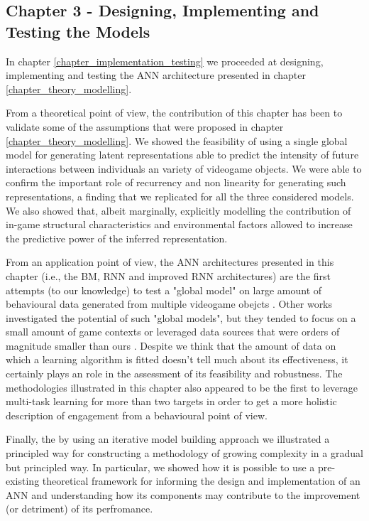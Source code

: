 \subsection{Chapter 3 - Designing, Implementing and Testing the Models }
\label{discussion_chapter_three}
In chapter \ref{chapter_implementation_testing} we proceeded at designing, implementing and testing the ANN architecture presented in chapter \ref{chapter_theory_modelling}.

From a theoretical point of view, the contribution of this chapter has been to validate some of the assumptions that were proposed in chapter \ref{chapter_theory_modelling}. We showed the feasibility of using a single global model for generating latent representations able to predict the intensity of future interactions between individuals an variety of videogame objects. We were able to confirm the important role of recurrency and non linearity for generating such representations, a finding that we replicated for all the three considered models. We also showed that, albeit marginally, explicitly modelling the contribution of in-game structural characteristics and environmental factors allowed to increase the predictive power of the inferred representation. 

From an application point of view, the ANN architectures presented in this chapter (i.e., the BM, RNN and improved RNN architectures) are the first attempts (to our knowledge) to test a "global model" on large amount of behavioural data generated from multiple videogame obejcts \cite{perianez2016churn, liu2018semi,kristensen2019combining,liu2019micro, roohi2020predicting}. Other works investigated the potential of such "global models", but they tended to focus on a small amount of game contexts \cite{zhao2020multi} or leveraged data sources that were orders of magnitude smaller than ours \cite{liu2019micro, zhao2020multi}. Despite we think that the amount of data on which a learning algorithm is fitted doesn't tell much about its effectiveness, it certainly plays an role in the assessment of its feasibility and robustness. The methodologies illustrated in this chapter also appeared to be the first to leverage multi-task learning for more than two targets \cite{liu2019micro, zhao2020multi}in order to get a more holistic description of engagement from a behavioural point of view.

Finally, the by using an iterative model building approach we illustrated a principled way for constructing a methodology of growing complexity in a gradual but principled way. In particular, we showed how it is possible to use a pre-existing theoretical framework for informing the design and implementation of an ANN and understanding how its components may contribute to the improvement (or detriment) of its perfromance.
